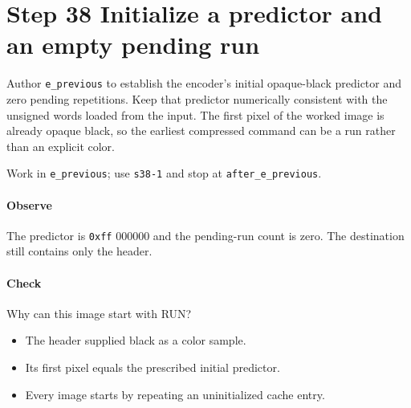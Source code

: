 \section{Step 38 Initialize a predictor and an empty pending run}\label{qoi-s38}
Author \texttt{e\_previous} to establish the encoder’s initial opaque-black predictor and zero pending repetitions. Keep that predictor numerically consistent with the unsigned words loaded from the input. The first pixel of the worked image is already opaque black, so the earliest compressed command can be a run rather than an explicit color.

Work in \texttt{e\_previous}; use \texttt{s38-1} and stop at \texttt{after\_e\_previous}.

\paragraph{Observe} The predictor is \texttt{0xff} 000000 and the pending-run count is zero. The destination still contains only the header.

\paragraph{Check} Why can this image start with RUN?
\begin{itemize}
\item[A.] The header supplied black as a color sample.
\item[B.] Its first pixel equals the prescribed initial predictor.
\item[C.] Every image starts by repeating an uninitialized cache entry.
\end{itemize}
